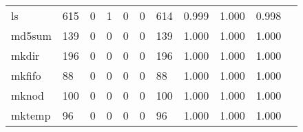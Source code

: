 \begin{longtable}{lp{1.2cm}p{1.2cm}p{1.2cm}p{1.2cm}p{1.2cm}p{1.2cm}p{1.2cm}p{1.2cm}p{1.2cm}p{1.2cm}}
ls        &                                   615 &                                                  0 &                                                  1 &                                                  0 &                                                  0 &                                                614 &                                              0.999 &                                              1.000 &                                              0.998 \\
md5sum    &                                   139 &                                                  0 &                                                  0 &                                                  0 &                                                  0 &                                                139 &                                              1.000 &                                              1.000 &                                              1.000 \\
mkdir     &                                   196 &                                                  0 &                                                  0 &                                                  0 &                                                  0 &                                                196 &                                              1.000 &                                              1.000 &                                              1.000 \\
mkfifo    &                                    88 &                                                  0 &                                                  0 &                                                  0 &                                                  0 &                                                 88 &                                              1.000 &                                              1.000 &                                              1.000 \\
mknod     &                                   100 &                                                  0 &                                                  0 &                                                  0 &                                                  0 &                                                100 &                                              1.000 &                                              1.000 &                                              1.000 \\
mktemp    &                                    96 &                                                  0 &                                                  0 &                                                  0 &                                                  0 &                                                 96 &                                              1.000 &                                              1.000 &                                              1.000 \\

\end{longtable}
